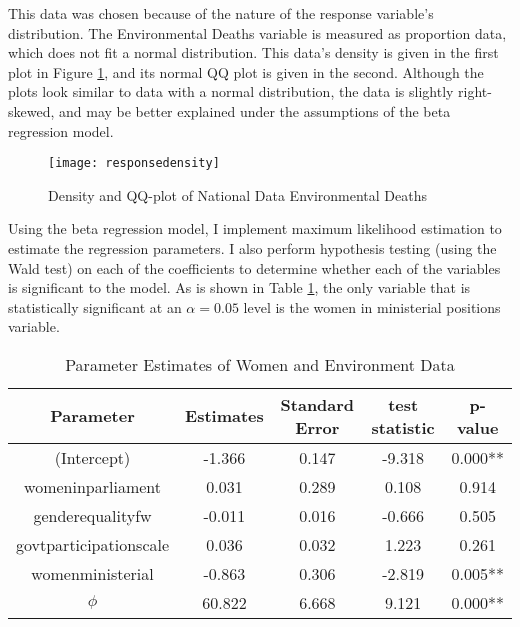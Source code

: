 \documentclass{svproc}
\begin{document}
This data was chosen because of the nature of the response variable's distribution. The Environmental Deaths variable is measured as proportion data, which does not fit a normal distribution. This data's density is given in the first plot in Figure \ref{responsedensity}, and its normal QQ plot is given in the second. Although the plots look similar to data with a normal distribution, the data is slightly right-skewed, and may be better explained under the assumptions of the beta regression model. 

\begin{figure}
\begin{center}
\caption{Density and QQ-plot of National Data Environmental Deaths}
\texttt{[image: responsedensity]}
\label{responsedensity}
\smallskip
\end{center}
\end{figure}

Using the beta regression model, I implement maximum likelihood estimation to estimate the regression parameters. I also perform hypothesis testing (using the Wald test) on each of the coefficients to determine whether each of the variables is significant to the model. As is shown in Table \ref{tab:estdat}, the only variable that is statistically significant at an $\alpha=0.05$ level is the women in ministerial positions variable. 

\begin{table}[H]
\caption{Parameter Estimates of Women and Environment Data}
\fontsize{9}{12}\selectfont
\begin{center}
\begin{tabular}{|c|c|c|c|c|}
\hline
\textbf{ Parameter } & \textbf{ Estimates } & \textbf{ Standard Error } & \textbf{ test statistic } & \textbf{ p-value } \\
\hline
(Intercept) & -1.366 & 0.147 & -9.318 & 0.000** \\
womeninparliament & 0.031 & 0.289 & 0.108 & 0.914 \\
genderequalityfw & -0.011 & 0.016 & -0.666 & 0.505 \\
govtparticipationscale & 0.036 & 0.032 & 1.223 & 0.261 \\
womenministerial & -0.863 & 0.306 & -2.819 & 0.005** \\
$\phi$ & 60.822 & 6.668 & 9.121 & 0.000** \\
\hline
\end{tabular}
\label{tab:estdat}
\end{center}
\end{table}
\end{document}
